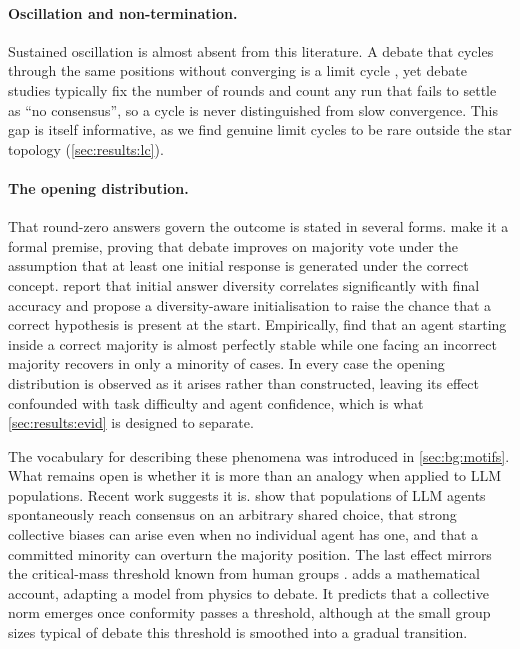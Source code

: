 \paragraph{Oscillation and non-termination.}
Sustained oscillation is almost absent from this literature. A debate that
cycles through the same positions without converging is a limit cycle
\citep{strogatz2015nonlinear}, yet debate studies typically fix the number of
rounds and count any run that fails to settle as ``no consensus'', so a cycle
is never distinguished from slow convergence. This gap is itself informative, as we
find genuine limit cycles to be rare outside the star topology
(\autoref{sec:results:lc}).

\paragraph{The opening distribution.}
That round-zero answers govern the outcome is stated in several forms.
\citet{hu2025stabilitydetection} make it a formal premise, proving that debate
improves on majority vote under the assumption that at least one
initial response is generated under the correct concept.
\citet{zhu2026demystifying} report that initial answer diversity correlates
significantly with final accuracy and propose a diversity-aware initialisation
to raise the chance that a correct hypothesis is present at the start.
Empirically, \citet{wu2025reallydebate} find that an agent starting inside a
correct majority is almost perfectly stable while one facing an incorrect
majority recovers in only a minority of cases. In every case the opening distribution is observed as
it arises rather than constructed, leaving its effect confounded with task
difficulty and agent confidence, which is what \autoref{sec:results:evid} is
designed to separate.

\medskip
\noindent The vocabulary for describing these phenomena was introduced in
\autoref{sec:bg:motifs}. What remains open is whether it is more than an analogy
when applied to \ac{LLM} populations. Recent work suggests it is.
\citet{ashery2025conventions} show that populations of \ac{LLM} agents spontaneously
reach consensus on an arbitrary shared choice, that strong collective biases can
arise even when no individual agent has one, and that a committed minority can
overturn the majority position. The last effect mirrors the critical-mass threshold
known from human groups \citep{centola2018tipping}. \citet{okawa2026biasedconsensus}
adds a mathematical account, adapting a model from physics to debate. It predicts
that a collective norm emerges once conformity passes a threshold, although at the
small group sizes typical of debate this threshold is smoothed into a gradual
transition.


